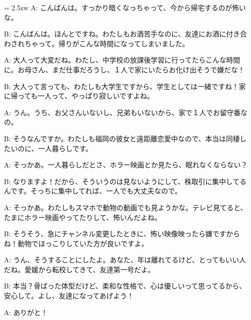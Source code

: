 \documentclass[11pt]{amsart}
\title{}
\author{}
\newenvironment{hangall}[1]{\hangindent = 2.5zw\everypar{\hangindent = 2.5zw}}{}
\begin{document}
\maketitle
\begin{hangall}{}%
A: こんばんは。すっかり暗くなっちゃって、今から帰宅するのが怖いな。

B: こんばんは。ほんとですね。わたしもお酒苦手なのに、友達にお酒に付き合わされちゃって。帰りがこんな時間になってしまいました。

A: 大人って大変だね。わたし、中学校の放課後学習に行ってたらこんな時間に。お母さん、まだ仕事だろうし、１人で家にいたらお化け出そうで嫌だな！

B: 大人って言っても、わたしも大学生ですから、学生としては一緒ですね！家に帰っても一人って、やっぱり寂しいですよね。

A: うん。うち、お父さんいないし、兄弟もいないから、家で１人でお留守番なの。

B: そうなんですか。わたしも福岡の彼女と遠距離恋愛中なので、本当は同棲したいのに、一人暮らしです。

A: そっかあ。一人暮らしだとさ、ホラー映画とか見たら、眠れなくならない？

B: なりますよ！だから、そういうのは見ないようにして、株取引に集中してるんです。そっちに集中してれば、一人でも大丈夫なので。

A: そっかあ。わたしもスマホで動物の動画でも見ようかな。テレビ見てると、たまにホラー映画やってたりして、怖いんだよね。

B: そうそう、急にチャンネル変更したときに、怖い映像映ったら嫌ですからね！動物でほっこりしていた方が良いですよ。

A: うん、そうすることにしたよ。あなた、年は離れてるけど、とってもいい人だね。愛媛から転校してきて、友達第一号だよ。

B: 本当？骨ばった体型だけど、柔和な性格で、心は優しいって思ってるから、安心して。よし、友達になってあげよう！

A: ありがと！
\end{hangall}
\end{document}
